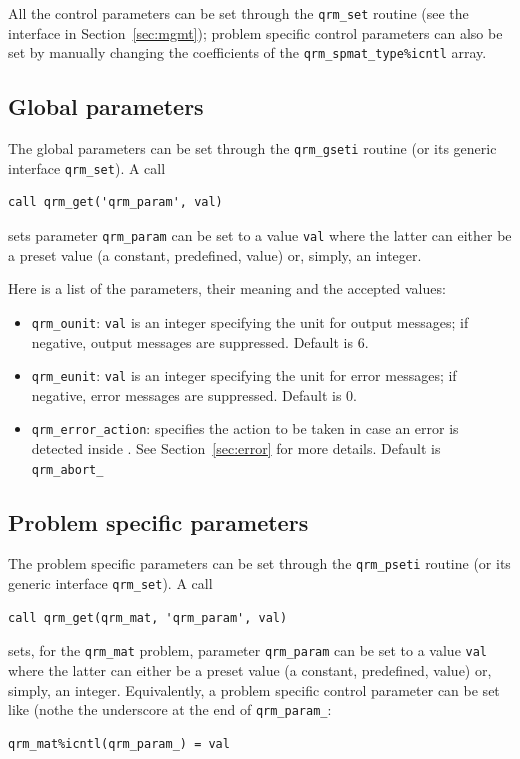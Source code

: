 \documentclass[11pt]{article}
\begin{document}
All the control parameters can be set through the \texttt{qrm\_set}
routine (see the interface in Section~\ref{sec:mgmt}); problem
specific control parameters can also be set by manually changing the
coefficients of the \texttt{qrm\_spmat\_type\%icntl} array. 

\subsection{Global parameters}
The global parameters can be set through the \texttt{qrm\_gseti}
routine (or its generic interface \texttt{qrm\_set}). A call
\begin{lstlisting}
call qrm_get('qrm_param', val)
\end{lstlisting}
sets parameter \texttt{qrm\_param} can be set to a value \texttt{val}
where the latter can either be a preset value (a constant, predefined,
value) or, simply, an integer.

Here is a list of the parameters, their meaning and the accepted
values:

\begin{itemize}
\item \texttt{qrm\_ounit}: \texttt{val} is an integer specifying the
  unit for output messages; if negative, output messages are
  suppressed. Default is 6.
\item \texttt{qrm\_eunit}:  \texttt{val} is an integer specifying the
  unit for error messages; if negative, error messages are suppressed.
  Default is 0.
\item \texttt{qrm\_error\_action}: specifies the action to be taken in
  case an error is detected inside \qrm. See Section~\ref{sec:error}
  for more details. Default is \texttt{qrm\_abort\_}
\end{itemize}



\subsection{Problem specific parameters}
The problem specific parameters can be set through the \texttt{qrm\_pseti}
routine (or its generic interface \texttt{qrm\_set}). A call
\begin{lstlisting}
call qrm_get(qrm_mat, 'qrm_param', val)
\end{lstlisting}
sets, for the \texttt{qrm\_mat} problem, parameter \texttt{qrm\_param}
can be set to a value \texttt{val} where the latter can either be a
preset value (a constant, predefined, value) or, simply, an integer.
Equivalently, a problem specific control parameter can be set like
(nothe the underscore at the end of \texttt{qrm\_param\_}:
\begin{lstlisting}
qrm_mat%icntl(qrm_param_) = val
\end{lstlisting}
\end{document}
